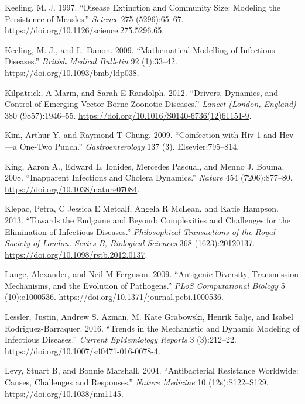 \documentclass[]{book}
\theoremstyle{definition}
\theoremstyle{definition}
\theoremstyle{definition}
\theoremstyle{remark}
\begin{document}
\leavevmode\hypertarget{ref-keeling97a}{}%
Keeling, M. J. 1997. ``Disease Extinction and Community Size: Modeling
the Persistence of Measles.'' \emph{Science} 275 (5296):65--67.
\url{https://doi.org/10.1126/science.275.5296.65}.

\leavevmode\hypertarget{ref-keeling09}{}%
Keeling, M. J., and L. Danon. 2009. ``Mathematical Modelling of
Infectious Diseases.'' \emph{British Medical Bulletin} 92 (1):33--42.
\url{https://doi.org/10.1093/bmb/ldp038}.

\leavevmode\hypertarget{ref-kilpatrick12}{}%
Kilpatrick, A Marm, and Sarah E Randolph. 2012. ``Drivers, Dynamics, and
Control of Emerging Vector-Borne Zoonotic Diseases.'' \emph{Lancet
(London, England)} 380 (9857):1946--55.
\url{https://doi.org/10.1016/S0140-6736(12)61151-9}.

\leavevmode\hypertarget{ref-kim09}{}%
Kim, Arthur Y, and Raymond T Chung. 2009. ``Coinfection with Hiv-1 and
Hcv---a One-Two Punch.'' \emph{Gastroenterology} 137 (3).
Elsevier:795--814.

\leavevmode\hypertarget{ref-king08}{}%
King, Aaron A., Edward L. Ionides, Mercedes Pascual, and Menno J. Bouma.
2008. ``Inapparent Infections and Cholera Dynamics.'' \emph{Nature} 454
(7206):877--80. \url{https://doi.org/10.1038/nature07084}.

\leavevmode\hypertarget{ref-klepac13}{}%
Klepac, Petra, C Jessica E Metcalf, Angela R McLean, and Katie Hampson.
2013. ``Towards the Endgame and Beyond: Complexities and Challenges for
the Elimination of Infectious Diseases.'' \emph{Philosophical
Transactions of the Royal Society of London. Series B, Biological
Sciences} 368 (1623):20120137.
\url{https://doi.org/10.1098/rstb.2012.0137}.

\leavevmode\hypertarget{ref-lange09}{}%
Lange, Alexander, and Neil M Ferguson. 2009. ``Antigenic Diversity,
Transmission Mechanisms, and the Evolution of Pathogens.'' \emph{PLoS
Computational Biology} 5 (10):e1000536.
\url{https://doi.org/10.1371/journal.pcbi.1000536}.

\leavevmode\hypertarget{ref-lessler16}{}%
Lessler, Justin, Andrew S. Azman, M. Kate Grabowski, Henrik Salje, and
Isabel Rodriguez-Barraquer. 2016. ``Trends in the Mechanistic and
Dynamic Modeling of Infectious Diseases.'' \emph{Current Epidemiology
Reports} 3 (3):212--22. \url{https://doi.org/10.1007/s40471-016-0078-4}.

\leavevmode\hypertarget{ref-levy04}{}%
Levy, Stuart B, and Bonnie Marshall. 2004. ``Antibacterial Resistance
Worldwide: Causes, Challenges and Responses.'' \emph{Nature Medicine} 10
(12s):S122--S129. \url{https://doi.org/10.1038/nm1145}.
\end{document}

